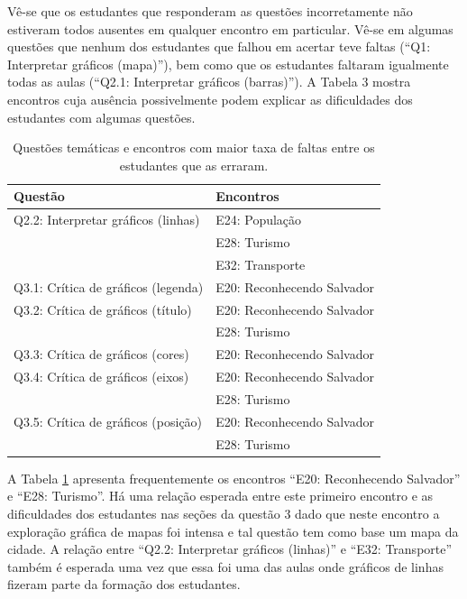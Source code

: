 \documentclass[
]{book}
\begin{document}
Vê-se que os estudantes que responderam as questões incorretamente não estiveram todos ausentes em qualquer encontro em particular. Vê-se em algumas questões que nenhum dos estudantes que falhou em acertar teve faltas (``Q1: Interpretar gráficos (mapa)''), bem como que os estudantes faltaram igualmente todas as aulas (``Q2.1: Interpretar gráficos (barras)''). A Tabela 3 mostra encontros cuja ausência possivelmente podem explicar as dificuldades dos estudantes com algumas questões.

\begin{table}

\caption{\label{tab:quadroimpacto3}Questões temáticas e encontros com maior taxa de faltas entre os estudantes que as erraram.}
\centering
\begin{tabular}[t]{l|l}
\hline
Questão & Encontros\\
\hline
Q2.2: Interpretar gráficos (linhas) & E24: População\\
\hline
 & E28: Turismo\\
\hline
 & E32: Transporte\\
\hline
Q3.1: Crítica de gráficos (legenda) & E20: Reconhecendo Salvador\\
\hline
Q3.2: Crítica de gráficos (título) & E20: Reconhecendo Salvador\\
\hline
 & E28: Turismo\\
\hline
Q3.3: Crítica de gráficos (cores) & E20: Reconhecendo Salvador\\
\hline
Q3.4: Crítica de gráficos (eixos) & E20: Reconhecendo Salvador\\
\hline
 & E28: Turismo\\
\hline
Q3.5: Crítica de gráficos (posição) & E20: Reconhecendo Salvador\\
\hline
 & E28: Turismo\\
\hline
\end{tabular}
\end{table}

A Tabela \ref{tab:quadroimpacto3} apresenta frequentemente os encontros ``E20: Reconhecendo Salvador'' e ``E28: Turismo''. Há uma relação esperada entre este primeiro encontro e as dificuldades dos estudantes nas seções da questão 3 dado que neste encontro a exploração gráfica de mapas foi intensa e tal questão tem como base um mapa da cidade. A relação entre ``Q2.2: Interpretar gráficos (linhas)'' e ``E32: Transporte'' também é esperada uma vez que essa foi uma das aulas onde gráficos de linhas fizeram parte da formação dos estudantes.
\end{document}
